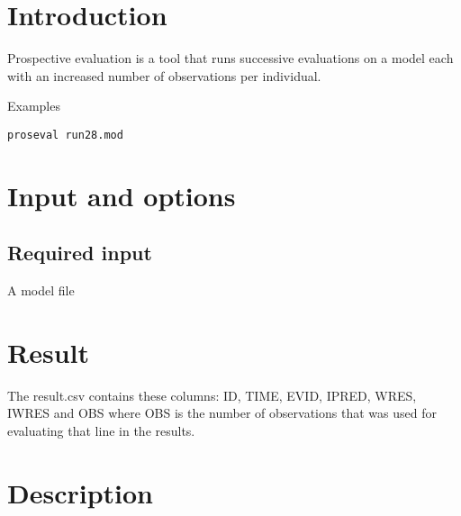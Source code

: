 

\newcommand{\guidetoolname}{proseval}



\maketitle


\section{Introduction}
Prospective evaluation is a tool that runs successive evaluations on a model each with an increased number of observations per individual.

Examples
\begin{verbatim}
proseval run28.mod
\end{verbatim}

\section{Input and options}

\subsection{Required input}
A model file



\section{Result}

The result.csv contains these columns: ID, TIME, EVID, IPRED, WRES, IWRES and OBS where
OBS is the number of observations that was used for evaluating that line in the results.

\section{Description}

